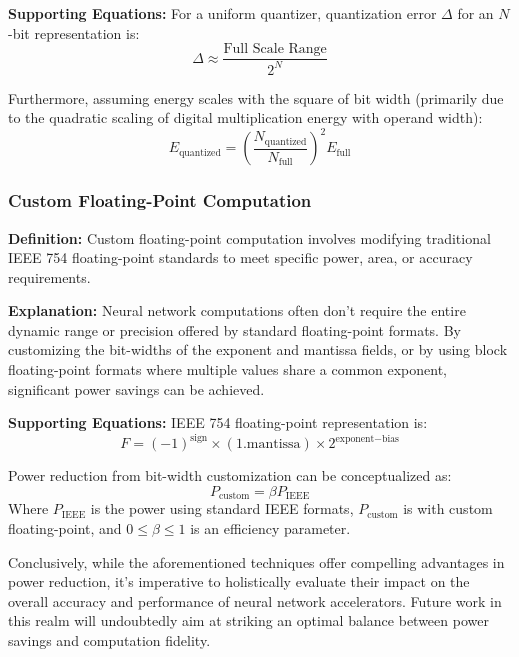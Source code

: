 \textbf{Supporting Equations:}
For a uniform quantizer, quantization error \( \Delta \) for an \( N \)-bit representation is:
\begin{equation}
\Delta \approx \frac{\text{Full Scale Range}}{2^N}
\end{equation}

Furthermore, assuming energy scales with the square of bit width (primarily due to the quadratic scaling of digital multiplication energy with operand width):
\begin{equation}
E_{\text{quantized}} = \left( \frac{N_{\text{quantized}}}{N_{\text{full}}}\right)^2 E_{\text{full}}
\end{equation}

\subsubsection{Custom Floating-Point Computation}

\textbf{Definition:} Custom floating-point computation involves modifying traditional IEEE 754 floating-point standards to meet specific power, area, or accuracy requirements.

\textbf{Explanation:} Neural network computations often don't require the entire dynamic range or precision offered by standard floating-point formats. By customizing the bit-widths of the exponent and mantissa fields, or by using block floating-point formats where multiple values share a common exponent, significant power savings can be achieved.

\textbf{Supporting Equations:}
IEEE 754 floating-point representation is:
\begin{equation}
F = (-1)^{\text{sign}} \times (1.\text{mantissa}) \times 2^{\text{exponent} - \text{bias}}
\end{equation}

Power reduction from bit-width customization can be conceptualized as:
\begin{equation}
P_{\text{custom}} = \beta P_{\text{IEEE}}
\end{equation}
Where \( P_{\text{IEEE}} \) is the power using standard IEEE formats, \( P_{\text{custom}} \) is with custom floating-point, and \( 0 \leq \beta \leq 1 \) is an efficiency parameter.

Conclusively, while the aforementioned techniques offer compelling advantages in power reduction, it's imperative to holistically evaluate their impact on the overall accuracy and performance of neural network accelerators. Future work in this realm will undoubtedly aim at striking an optimal balance between power savings and computation fidelity.

